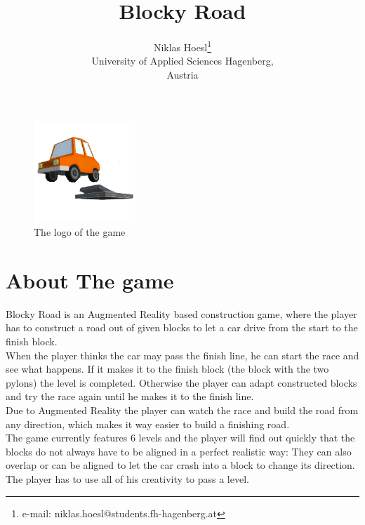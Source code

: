 \documentclass{vgtc}                          %
\title{Blocky Road}
\author{Niklas Hoesl\thanks{e-mail: niklas.hoesl@students.fh-hagenberg.at}\\ %
        \scriptsize University of Applied Sciences Hagenberg, \\\scriptsize Austria}
\begin{document}


\maketitle

\begin{figure}[tb]
	\centering
	\includegraphics[width=1.5in]{logo}
	\caption{The logo of the game}
	\label{fig:logo}
\end{figure}

\section{About The game}
Blocky Road is an Augmented Reality based construction game, where the player has to construct a road out of given blocks to let a car drive from the start to the finish block.\\
When the player thinks the car may pass the finish line, he can start the race and see what happens. If it makes it to the finish block (the block with the two pylons) the level is completed. Otherwise the player can adapt constructed blocks and try the race again until he makes it to the finish line.\\
Due to Augmented Reality the player can watch the race and build the road from any direction, which makes it way easier to build a finishing road.\\
The game currently features 6 levels and the player will find out quickly that the blocks do not always have to be aligned in a perfect realistic way: They can also overlap or can be aligned to let the car crash into a block to change its direction. The player has to use all of his creativity to pass a level. \\
\end{document}
